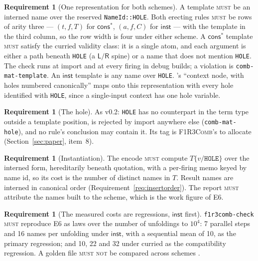 \documentclass[11pt,a4paper]{article}
\newcommand{\code}[1]{\texttt{#1}}
\newcommand{\Comb}{\textsc{F1R3Comb}}
\newcommand{\MUST}{\textsc{must}}
\newcommand{\MUSTNOT}{\textsc{must not}}
\theoremstyle{definition}
\newtheorem{requirement}[definition]{Requirement}
\theoremstyle{plain}
\newcommand{\Lft}{\mathsf{L}}
\newcommand{\Rgt}{\mathsf{R}}
\newcommand{\inst}{\mathsf{inst}}
\newcommand{\cstar}{\mathsf{cons}^{*}}
\begin{document}
\begin{requirement}[One representation for both schemes]\label{req:template}
A template \MUST{} be an interned name over the reserved \code{NameId::HOLE}.
Both erecting rules \MUST{} be rows of arity three --- $(t,f,T)$ for $\cstar$,
$(a,f,C)$ for $\inst$ --- with the template in the third column, so the row
width is four under either scheme. A $\cstar$ template \MUST{} satisfy the
curried validity class: it is a single atom, and each argument is either a
path beneath \code{HOLE} (a $\Lft/\Rgt$ spine) or a name that does not mention
\code{HOLE}. The check runs at import and at every firing in debug builds;
a violation is \code{comb-mat-template}. An $\inst$ template is any name over
\code{HOLE}. \cite[Req.~5.23]{combspec}'s ``context node, with holes numbered
canonically'' maps onto this representation with every hole identified with
\code{HOLE}, since a single-input context has one hole variable.
\end{requirement}

\begin{requirement}[The hole]\label{req:hole}
As v0.2: \code{HOLE} has no counterpart in the term type outside a template
position, is rejected by import anywhere else (\code{comb-mat-hole}), and no
rule's conclusion may contain it. Its tag is \Comb's to allocate
(Section~\ref{sec:paper}, item~8).
\end{requirement}

\begin{requirement}[Instantiation]\label{req:subst}
The encode \MUST{} compute $T\{v/\code{HOLE}\}$ over the interned form,
hereditarily beneath quotation, with a per-firing memo keyed by name id, so
its cost is the number of distinct names in $T$. Result names are interned in
canonical order (Requirement~\ref{req:insertorder}). The report \MUST{}
attribute the names built to the scheme, which is the work figure of E6.
\end{requirement}

\begin{requirement}[The measured costs are regressions, $\inst$ first]
\label{req:dxlaw}
\code{f1r3comb-check} \MUST{} reproduce E6 as laws over the number of
unfoldings to $10^{4}$: 7 parallel steps and 16 names per unfolding under
$\inst$, with a sequential mean of 10, as the primary regression; and 10, 22
and 32 under curried as the compatibility regression. A golden
file \MUSTNOT{} be compared across schemes \cite[Dec.~5.19]{combspec}.
\end{requirement}
\end{document}
